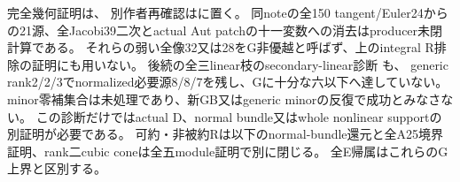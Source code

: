 \documentclass[a4paper,11pt]{ltjsarticle}
\theoremstyle{definition}
\begin{document}
完全幾何証明は、
別作者再確認はに置く。
同noteの全150 tangent/Euler24からの21源、全Jacobi39二次とactual Aut patchの十一変数への消去はproducer未閉計算である。
それらの弱い全像32又は28をG非優越と呼ばず、上のintegral R排除の証明にも用いない。
後続の全三linear枝のsecondary-linear診断
も、
generic rank2/2/3でnormalized必要源8/8/7を残し、Gに十分な六以下へ達していない。
minor零補集合は未処理であり、新GB又はgeneric minorの反復で成功とみなさない。
この診断だけではactual D、normal bundle又はwhole nonlinear supportの別証明が必要である。
可約・非被約Rは以下のnormal-bundle還元と全A25境界証明、rank二cubic coneは全五module証明で別に閉じる。
全E帰属はこれらのG上界と区別する。
\end{document}
